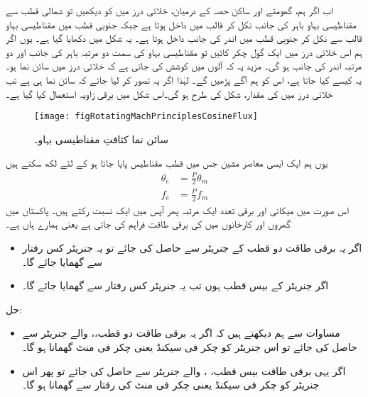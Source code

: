 اب اگر ہم، گھومتے اور ساکن حصہ کے درمیان، خلائی درز میں  کو دیکھیں تو شمالی قطب سے مقناطیسی بہاو باہر کی جانب  نکل کر  قالب میں داخل ہوتا ہے جبکہ جنوبی قطب میں مقناطیسی بہاو قالب سے نکل کر جنوبی قطب میں اندر کی جانب داخل ہوتا ہے۔ یہ شکل   میں دکھایا گیا ہے۔ یوں اگر ہم اس خلائی درز میں ایک گول چکر کاٹیں تو مقناطیسی بہاو کی سمت  دو مرتبہ باہر کی جانب اور دو مرتبہ اندر کی جانب ہو گی۔ مزید یہ کہ   آلوں میں کوشش کی جاتی ہے کہ خلائی درز میں  سائن نما ہو۔ یہ کیسے کیا جاتا ہے، اس کو ہم آگے پڑھیں گے۔  لہٰذا اگر یہ تصور کر لیا جائے کہ  سائن نما ہی ہے تب  خلائی درز میں  کی مقدار، شکل   کی طرح ہو گی۔اس شکل میں برقی زاویہ  استعمال کیا گیا ہے۔ 
\begin{figure}
\centering
\texttt{[image: figRotatingMachPrinciplesCosineFlux]}
\caption{سائن نما کثافتِ مقناطیسی بہاو۔}
\label{شکل_گھومتے_مشین_سائن_نما_بہاو}
\end{figure}

 یوں ہم ایک ایسی معاصر مشین جس میں  قطب مقناطیس پایا جاتا ہو کے لئے لکھ سکتے ہیں
\begin{align}
\theta_e&=\frac{P}{2} \theta_m\\
f_e&=\frac{P}{2} f_m  \label{مساوات_گھومتے_مشین_برقی_میکانی_تعدد_تعلق}
\end{align}
اس صورت میں میکانی اور برقی تعدد ایک مرتبہ پھر آپس میں ایک نسبت رکتے ہیں۔ 
%
پاکستان میں گھروں اور کارخانوں میں  کی برقی طاقت فراہم کی جاتی ہے یعنی ہمارے ہاں  ہے۔
\begin{itemize}
\item
اگر یہ برقی طاقت دو قطب کے جنریٹر سے حاصل کی جائے تو یہ جنریٹر  کس رفتار سے گھمایا جائے گا۔
\item
اگر جنریٹر کے بیس قطب ہوں تب یہ جنریٹر کس رفتار سے گھمایا جائے گا۔
\end{itemize}

حل:
\begin{itemize}
\item
مساوات   سے ہم دیکھتے ہیں کہ اگر یہ برقی طاقت دو قطب،،  والے جنریٹر سے حاصل کی جائے تو اس جنریٹر کو  چکر فی سیکنڈ یعنی  چکر فی منٹ گھمانا ہو گا۔
\item
 اگر یہی برقی طاقت بیس قطب، ،  والے جنریٹر سے حاصل کی جائے تو پھر اس جنریٹر کو  چکر فی سیکنڈ یعنی  چکر فی منٹ کی رفتار سے گھمانا ہو گا۔
\end{itemize}
%

